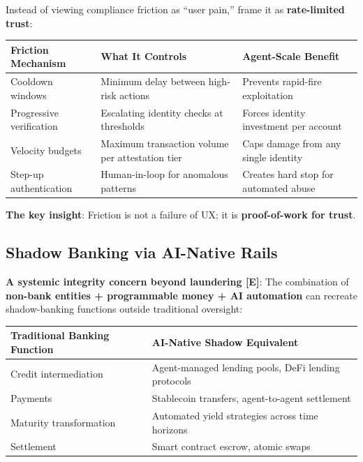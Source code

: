 \documentclass[11pt,letterpaper]{article}
\begin{document}
\begin{infobox}
Instead of viewing compliance friction as ``user pain,'' frame it as \textbf{rate-limited trust}:

\begin{center}
\small
\begin{tabular}{L{3.5cm}L{4.5cm}L{4cm}}
\toprule
\textbf{Friction Mechanism} & \textbf{What It Controls} & \textbf{Agent-Scale Benefit} \\
\midrule
Cooldown windows & Minimum delay between high-risk actions & Prevents rapid-fire exploitation \\
Progressive verification & Escalating identity checks at thresholds & Forces identity investment per account \\
Velocity budgets & Maximum transaction volume per attestation tier & Caps damage from any single identity \\
Step-up authentication & Human-in-loop for anomalous patterns & Creates hard stop for automated abuse \\
\bottomrule
\end{tabular}
\end{center}

\textbf{The key insight}: Friction is not a failure of UX; it is \textbf{proof-of-work for trust}.
\end{infobox}

\subsection{Shadow Banking via AI-Native Rails}

\textbf{A systemic integrity concern beyond laundering [E]}: The combination of \textbf{non-bank entities + programmable money + AI automation} can recreate shadow-banking functions outside traditional oversight:

\begingroup\small
\begin{longtable}{L{0.375\dimexpr{}\tabcolsep\relax}L{0.625\dimexpr{}\tabcolsep\relax}}
\toprule
\textbf{Traditional Banking Function} & \textbf{AI-Native Shadow Equivalent} \\
\midrule
\endhead
Credit intermediation & Agent-managed lending pools, DeFi lending protocols \\
Payments & Stablecoin transfers, agent-to-agent settlement \\
Maturity transformation & Automated yield strategies across time horizons \\
Settlement & Smart contract escrow, atomic swaps \\
\bottomrule
\end{longtable}
\endgroup
\end{document}
